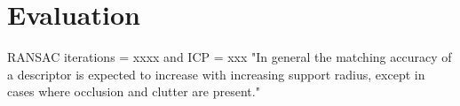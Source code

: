 \documentclass[10pt,twocolumn,letterpaper]{article}
\begin{document}
\section{Evaluation}\label{sec:evaluation}

RANSAC iterations = xxxx and ICP = xxx 
"In general the matching accuracy of a descriptor is expected to increase with increasing support radius, except in cases where occlusion and clutter are present." 
\end{document}
